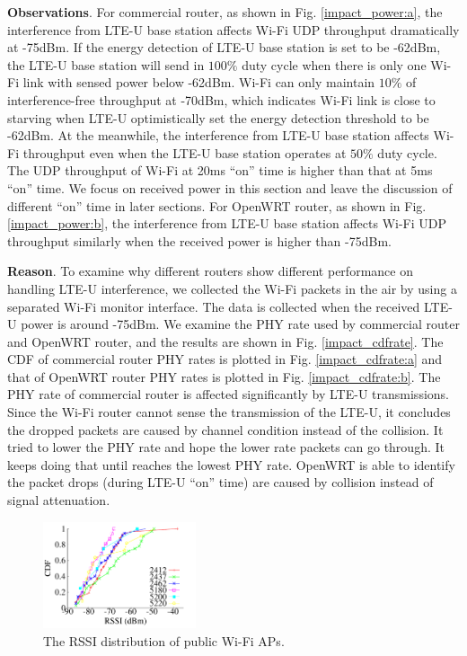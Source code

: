 \textbf{Observations}.
For commercial router, as shown in Fig. \ref{impact_power:a},
the interference from LTE-U base station affects Wi-Fi UDP throughput dramatically 
at -75dBm. 
If the energy detection of LTE-U base station is set to be -62dBm, 
the LTE-U base station will send in $100\%$ duty cycle when there is
only one Wi-Fi link with sensed power below -62dBm. 
Wi-Fi can only maintain $10\%$ of interference-free throughput at -70dBm, 
which indicates Wi-Fi link is close to starving when 
LTE-U optimistically set the energy detection threshold to be -62dBm. 
At the meanwhile, the interference from LTE-U base station affects 
Wi-Fi throughput even when the LTE-U base station operates at $50\%$
duty cycle. 
The UDP throughput of Wi-Fi at 20ms ``on'' time is higher
than that at 5ms ``on'' time. 
We focus on received power in this section and leave the discussion of different ``on'' time
in later sections. 
For OpenWRT router, as shown in Fig. \ref{impact_power:b},
the interference from LTE-U base station affects Wi-Fi UDP throughput 
similarly when the received power is higher than -75dBm. 


\textbf{Reason}.
To examine why different routers show different performance 
on handling LTE-U interference,
we collected the Wi-Fi packets in the air by using 
a separated Wi-Fi monitor interface.
The data is collected when the received LTE-U power is around -75dBm. 
We examine the PHY rate used by commercial router
and OpenWRT router, and the results
are shown in Fig. \ref{impact_cdfrate}.
The CDF of commercial router PHY rates is plotted
in Fig. \ref{impact_cdfrate:a} and that of OpenWRT
router PHY rates is plotted in Fig. \ref{impact_cdfrate:b}. 
The PHY rate of commercial router is affected significantly
by LTE-U transmissions.  
Since the Wi-Fi router cannot sense the transmission of the
LTE-U, it concludes the dropped packets are caused
by channel condition instead of the collision.
It tried to lower the PHY rate and hope the 
lower rate packets can go through. 
It keeps doing that until reaches the lowest PHY rate.
OpenWRT is able to identify the packet drops (during LTE-U ``on'' time)
are caused by collision instead of signal attenuation.  



\begin{figure}[!ht]
 \centering
    \includegraphics[width=0.4\textwidth]{./figures/public_ap_rssi}
 \caption{The RSSI distribution of public Wi-Fi APs.}
  \label{fig:public_ap_rssi}
\end{figure}



